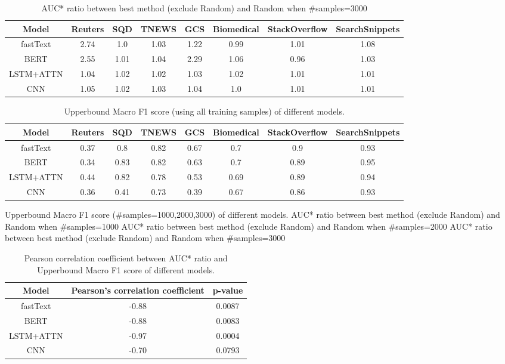 \begin{table}[th]
	\scriptsize
	\centering
	\begin{tabular}{cccccccc}
		\toprule
		Model & Reuters    & SQD   & TNEWS   & GCS& Biomedical & StackOverflow & SearchSnippets\\ \hline
		fastText & 2.74 & 1.0 & 1.03 & 1.22 & 0.99 & 1.01 & 1.08 \\
		BERT & 2.55 & 1.01 & 1.04 & 2.29 & 1.06 & 0.96 & 1.03 \\
		LSTM+ATTN & 1.04 & 1.02 & 1.02 & 1.03 & 1.02 & 1.01 & 1.01 \\
		CNN & 1.05 & 1.02 & 1.03 & 1.04 & 1.0 & 1.01 & 1.01 \\
		
		\bottomrule
	\end{tabular}
	\caption{AUC* ratio between best method (exclude Random) and Random when \#samples=3000}
	\label{table:auc_ratio}
\end{table}

\begin{table}[th]
	\scriptsize
	\centering
	\begin{tabular}{cccccccc}
		\toprule
		Model & Reuters    & SQD   & TNEWS   & GCS& Biomedical & StackOverflow & SearchSnippets\\ \hline
		fastText & 0.37 & 0.8 & 0.82 & 0.67 & 0.7 & 0.9 & 0.93\\
		BERT & 0.34 & 0.83 & 0.82 & 0.63 & 0.7 & 0.89 & 0.95\\
		LSTM+ATTN & 0.44 & 0.82 & 0.78 & 0.53 & 0.69 & 0.89 & 0.94\\
		CNN & 0.36 & 0.41 & 0.73 & 0.39 & 0.67 & 0.86 & 0.93\\
		\bottomrule
	\end{tabular}
	\caption{Upperbound Macro F1 score (using all training samples) of different models.}
	\label{table:upperbound}
\end{table}

Upperbound Macro F1 score (\#samples=1000,2000,3000) of different models.
AUC* ratio between best method (exclude Random) and Random when \#samples=1000
AUC* ratio between best method (exclude Random) and Random when \#samples=2000
AUC* ratio between best method (exclude Random) and Random when \#samples=3000


\begin{table}[th]
	\scriptsize
	\centering
	\begin{tabular}{ccc}
		\toprule
		Model & Pearson's correlation coefficient & p-value\\ \hline
		fastText & -0.88 & 0.0087\\
		BERT & -0.88 & 0.0083\\
		LSTM+ATTN & -0.97 & 0.0004\\
		CNN & -0.70 & 0.0793\\
		\bottomrule
	\end{tabular}
	\caption{Pearson correlation coefficient
		 between AUC* ratio and Upperbound Macro F1 score of different models.}
	\label{table:pearson}
\end{table}



